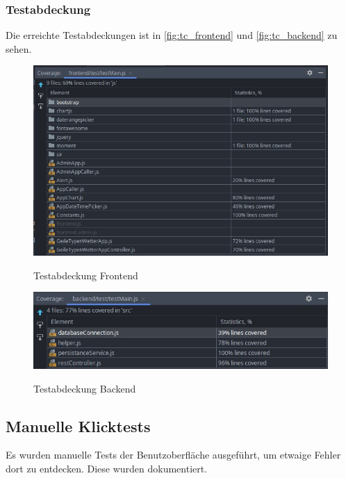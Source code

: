 \subsubsection*{Testabdeckung}
Die erreichte Testabdeckungen ist in \autoref{fig:tc_frontend} und \autoref{fig:tc_backend} zu sehen.
\begin{figure}[H]
    \centering
    \begin{minipage}[t]{1\textwidth}
        \caption{Testabdeckung Frontend}
        \includegraphics[width=1\textwidth]{img/tc_frontend2.png}\\
        \label{fig:tc_frontend}
    \end{minipage}
\end{figure}
\begin{figure}[H]
    \centering
    \begin{minipage}[t]{1\textwidth}
        \caption{Testabdeckung Backend}
        \includegraphics[width=1\textwidth]{img/tc_backend2.png}\\
        \label{fig:tc_backend}
    \end{minipage}
\end{figure}
\subsection{Manuelle Klicktests}
Es wurden manuelle Tests der Benutzoberfläche ausgeführt, um etwaige Fehler dort zu entdecken.
Diese wurden dokumentiert.
